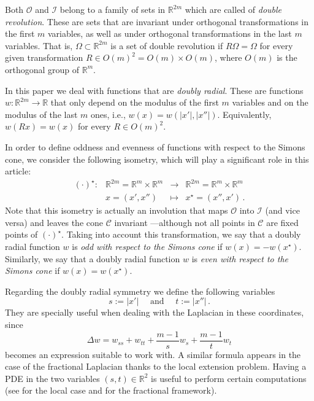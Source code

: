 \documentclass[12pt,reqno]{amsart}
\theoremstyle{definition}
\theoremstyle{remark}
\newcommand{\con}[1]{\mathbb{#1}}
\newcommand{\R}{\con{R}} %
\newcommand{\ccal}{\mathscr{C}}
\newcommand{\ical}{\mathcal{I}}
\newcommand{\ocal}{\mathcal{O}}
\numberwithin{equation}{section}
\begin{document}
Both $\ocal$ and $\ical$ belong to a family of sets in $\R^{2m}$ which are called of \emph{double revolution}. These are sets that are invariant under orthogonal transformations in the first $m$ variables, as well as under orthogonal transformations in the last $m$ variables. That is, $\Omega\subset \R^{2m}$ is a set of double revolution if $R\Omega = \Omega$ for every given transformation $R\in O(m)^2 = O(m) \times O(m)$, where  $O(m)$ is the orthogonal group of $\R^m$.

In this paper we deal with functions that are \emph{doubly radial}. These are functions $w:\R^{2m}  \to \R$ that only depend on the modulus of the first $m$ variables and on the modulus of the last $m$ ones, i.e., $w(x) = w(|x'|,|x''|)$. Equivalently, $w(Rx) = w(x)$ for every $R \in O(m)^2$.

In order to define oddness and evenness of functions with respect to the Simons cone, we consider the following isometry, which will play a significant role in this article:
\begin{equation}
\label{Eq:DefStar}
\begin{matrix}
(\cdot)^\star \colon & \R^{2m}= \R^{m}\times \R^{m}  &\to&  \R^{2m}= \R^{m}\times \R^{m}  \\
& x = (x',x'') &\mapsto & x^\star = (x'',x')\,.
\end{matrix}
\end{equation}
Note that this isometry is actually an involution that maps $\ocal$ into $\ical$ (and vice versa) and leaves the cone $\ccal$ invariant ---although not all points in $\ccal$ are fixed points of $(\cdot)^\star$. Taking into account this transformation, we say that a doubly radial function $w$ is \emph{odd with respect to the Simons cone} if $w(x) = -w(x^\star)$. Similarly, we say that a doubly radial function $w$ is \emph{even with respect to the Simons cone} if $w(x) = w(x^\star)$.

Regarding the doubly radial symmetry we define the following variables
$$
s := |x'| \quad \text{ and } \quad t:=|x''|\,.
$$
They are specially useful when dealing with the Laplacian in these coordinates, since
\begin{equation}
\label{Eq:Laplacian-st}
\Delta w = w_{ss} + w_{tt} + \frac{m-1}{s}w_s + \frac{m-1}{t}w_t
\end{equation}
becomes an expression suitable to work with. A similar formula appears in the case of the fractional Laplacian thanks to the local extension problem. Having a PDE in the two variables $(s,t)\in \R^2$ is useful to perform certain computations (see \cite{CabreTerraI, CabreTerraII,Cabre-Saddle, CabreRosOton-DoubleRev} for the local case and \cite{Cinti-Saddle, Cinti-Saddle2, Felipe-Sanz-Perela:SaddleFractional} for the fractional framework).
\end{document}
